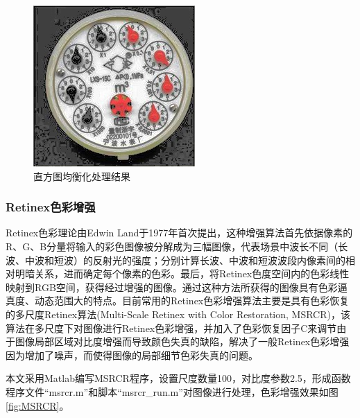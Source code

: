 \documentclass[a4paper]{ctexart}
\begin{document}
\begin{figure}[htbp]
\begin{minipage}[t]{0.25\textwidth}
		\includegraphics[width=\textwidth]{figure/equalizeHist/img5.jpg}
	\end{minipage}
	\caption{直方图均衡化处理结果}\label{fig:直方图均衡化}
\end{figure}


\subsubsection{Retinex色彩增强}
Retinex色彩理论由Edwin Land于1977年\cite{land1971lightness}首次提出，这种增强算法首先依据像素的R、G、B分量将输入的彩色图像被分解成为三幅图像，代表场景中波长不同（长波、中波和短波）的反射光的强度；分别计算长波、中波和短波波段内像素间的相对明暗关系，进而确定每个像素的色彩。最后，将Retinex色度空间内的色彩线性映射到RGB空间，获得经过增强的图像。通过这种方法所获得的图像具有色彩逼真度、动态范围大的特点。目前常用的Retinex色彩增强算法主要是具有色彩恢复的多尺度Retinex算法(Multi-Scale Retinex with Color Restoration, MSRCR)\cite{rahman1996multiscale}，该算法在多尺度下对图像进行Retinex色彩增强，并加入了色彩恢复因子C来调节由于图像局部区域对比度增强而导致颜色失真的缺陷，解决了一般Retinex色彩增强因为增加了噪声，而使得图像的局部细节色彩失真的问题。

本文采用Matlab编写MSRCR程序，设置尺度数量100，对比度参数2.5，形成函数程序文件“msrcr.m”和脚本“msrcr\_run.m”对图像进行处理，色彩增强效果如图\ref{fig:MSRCR}。
\end{document}
